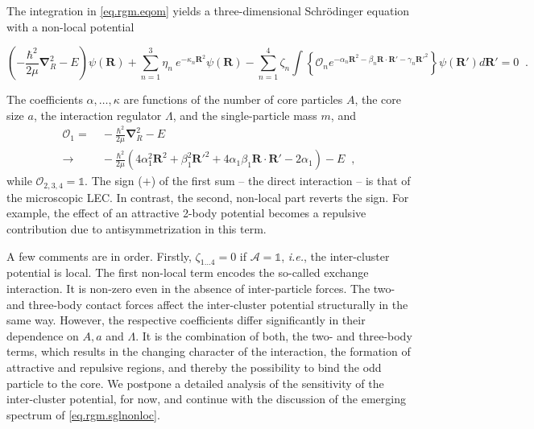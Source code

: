 \documentclass[aps,nofootinbib,prl,showpacs,twocolumn,groupedaddress,superscriptaddress]
{revtex4}
\newcommand{\la}{\label}
\newcommand{\be}{\begin{equation}}
\newcommand{\ee}{\end{equation}}
\newcommand{\ie}{\textit{i.e.}\;}
\newcommand{\ve}[1]{\ensuremath{\boldsymbol{#1}}}
\begin{document}
The integration in \eqref{eq.rgm.eqom} yields a three-dimensional 
Schr\"odinger equation with a non-local potential
\begin{widetext}
\be\label{eq.rgm.sglnonloc}
\left(-\frac{\hbar^2}{2\mu}\ve{\nabla}_R^2-E\right)\psi(\ve{R})+\sum_{n=1}^3\eta_n~e^{-\kappa_n\ve{R}^2}\psi(\ve{R})-
\sum_{n=1}^4\zeta_n\int\left\lbrace\mathcal{O}_ne^{-\alpha_n\ve{R}^2-\beta_n\ve{R}\cdot\ve{R}'-\gamma_n\ve{R}'^2}\right\rbrace\psi(\ve{R}') d\ve{R}'=0\;\;.
\ee
\end{widetext}
The coefficients $\alpha,\ldots,\kappa$ are functions of the number of
core particles $A$,
the core size $a$, the interaction regulator $\Lambda$,
and the single-particle mass $m$, and 
\begin{align}\la{eq.exop}
\mathcal{O}_1=&~-\frac{\hbar^2}{2\mu}\ve{\nabla}_R^2-E\\
\to&~-\frac{\hbar^2}{2\mu}\left(4\alpha_1^2\ve{R}^2+\beta_1^2\ve{R}'^2
+4\alpha_1\beta_1\ve{R}\cdot\ve{R}'-2\alpha_1\right)-E\;\;,\nonumber
\end{align}
while $\mathcal{O}_{2,3,4}=\mathbb{1}$. The sign ($+$) of the first sum -- the direct
interaction -- is that of the microscopic LEC. In contrast, the second, non-local
part reverts the sign. For example, the effect of an attractive 2-body potential
becomes a repulsive contribution due to antisymmetrization in this term.

A few comments are in order. Firstly, $\zeta_{1\ldots4}=0$ if $\mathcal{A}=\mathbb{1}$, \ie, the
inter-cluster potential is local. The first non-local term encodes the so-called exchange interaction.
It is non-zero even in the absence of inter-particle forces. The two- and three-body
contact forces affect the inter-cluster potential structurally in the same way. However, the respective
coefficients differ significantly in their dependence on $A,a$ and $\Lambda$. It is the combination
of both, the two- and three-body terms, which results in the changing character of the interaction,
the formation of attractive and repulsive regions, and thereby the possibility to bind the odd particle
to the core. We postpone a detailed analysis of the sensitivity of the inter-cluster potential,
for now, and continue with the discussion of the emerging spectrum of \eqref{eq.rgm.sglnonloc}.
\end{document}
